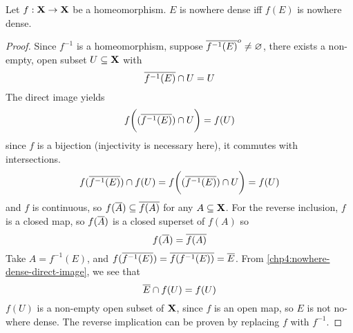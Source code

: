 \documentclass[../main-manifolds.tex]{subfiles}
\begin{document}
\begin{wts}\label{chp4:nowhere-dense-homeomorphisms}
    Let $f:{\mathbf{X}}\to{\mathbf{X}}$ be a homeomorphism. $E$ is nowhere dense iff $f(E)$ is nowhere dense.
\end{wts}
\begin{proof}
    Since $f^{-1}$ is a homeomorphism, suppose $\overline{f^{-1}(E)}^o\neq\varnothing$, there exists a non-empty, open subset $U\subseteq{\mathbf{X}}$ with
    \[
        \overline{f^{-1}(E)}\cap U = U
    \]
    The direct image yields 
    \[
        f\biggl((\overline{f^{-1}(E)})\cap U\biggr) = f(U)
    \]
    since $f$ is a bijection (injectivity is necessary here), it commutes with intersections.
    \begin{equation}\label{chp4:nowhere-dense-direct-image}
        f(\overline{f^{-1}(E)})\cap f(U) = f\biggl((\overline{f^{-1}(E)})\cap U\biggr) = f(U)
    \end{equation}
    and $f$ is continuous, so $f(\overline{A})\subseteq\overline{f(A)}$ for any $A\subseteq{\mathbf{X}}$. For the reverse inclusion, $f$ is a closed map, so $f(\overline{A})$ is a closed superset of $f(A)$ so 
    \[
        f(\overline{A}) = \overline{f(A)}
    \]
    Take $A = f^{-1}(E)$, and $f(\overline{f^{-1}(E)}) = \overline{f(f^{-1}(E))} = \overline{E}$. From \cref{chp4:nowhere-dense-direct-image}, we see that
    \[
        \overline{E}\cap f(U) = f(U)
    \]
    $f(U)$ is a non-empty open subset of ${\mathbf{X}}$, since $f$ is an open map, so $E$ is not no-where dense. The reverse implication can be proven by replacing $f$ with $f^{-1}$.
\end{proof}
\end{document}
